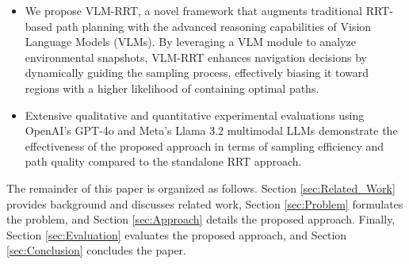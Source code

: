\begin{itemize}
\item We propose VLM-RRT, a novel framework that augments traditional RRT-based path planning with the advanced reasoning capabilities of Vision Language Models (VLMs). By leveraging a VLM module to analyze environmental snapshots, VLM-RRT enhances navigation decisions by dynamically guiding the sampling process, effectively biasing it toward regions with a higher likelihood of containing optimal paths.
\item Extensive qualitative and quantitative experimental evaluations using OpenAI's GPT-4o and Meta's Llama 3.2 multimodal LLMs demonstrate the effectiveness of the proposed approach in terms of sampling efficiency and path quality compared to the standalone RRT approach.
\end{itemize}

The remainder of this paper is organized as follows. Section \ref{sec:Related_Work} provides background and discusses related work, Section \ref{sec:Problem} formulates the problem, and Section \ref{sec:Approach} details the proposed approach. Finally, Section \ref{sec:Evaluation} evaluates the proposed approach, and Section \ref{sec:Conclusion} concludes the paper.

